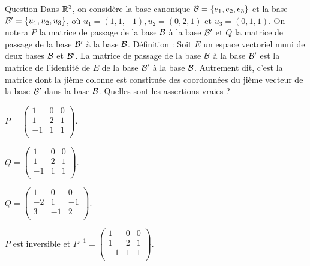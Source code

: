 \begin{multi}[multiple,feedback=
{Une matrice de passage est inversible, puisque l'application linéaire associée est bijective. L'inverse de la matrice de passage de la base \({\cal {B}}\) à la base \({\cal {B}}'\) est la matrice de passage de la base \({\cal {B}}'\) à la base \({\cal {B}}\).\\
\(P = \left(\begin{array}{rcc}
1&0&0\\
1&2&1\\ 
-1&1&1\\ 
\end{array}\right)\) et \(
Q = P^{-1} = \left(\begin{array}{rcc}
1&0&0\\
-2&1&-1\\ 
3&-1&2\\ 
\end{array}\right)\).
}]{Question}
Dans \(\mathbb{R}^3\), on considère la base canonique \({\cal {B}} =\{e_1,e_2,e_3\}\) et  la base \({\cal {B'}} =\{u_1,u_2,u_3\}\), où 
\(u_1=(1,1,-1), u_2=(0,2,1)\) et \(u_3=(0,1,1)\). On notera \(P\) la matrice de passage de la base \({\cal {B}}\) à la base \({\cal {B'}}\) et \(Q\) la matrice de passage de la base \({\cal {B'}}\) à la base \({\cal {B}}\).
\vskip0mm
Définition : Soit \(E\) un espace vectoriel muni de deux bases \({\cal {B}}\) et \({\cal {B}}'\).
La matrice de passage de la base \({\cal {B}}\) à la base  \({\cal {B}}'\) est la matrice de l'identité de \(E\) de la base 
\({\cal {B}}'\) à la base  \({\cal {B}}\). Autrement dit, c'est la matrice dont la jième colonne 
est constituée des coordonnées du jième vecteur de la base \({\cal {B}'}\) dans la base  \({\cal {B}}\).
\vskip2mm
Quelles sont les assertions vraies ?

    \item* \(P = \left(\begin{array}{rcc}
1&0&0\\
1&2&1\\
-1&1&1\\
\end{array}\right).\)
    \item \(Q = \left(\begin{array}{rcc}
1&0&0\\
1&2&1\\
-1&1&1\\
\end{array}\right).\)
    \item* \(Q = \left(\begin{array}{rcc}
1&0&0\\
-2&1&-1\\
3&-1&2\\
\end{array}\right).\)
    \item \(P\) est inversible et \(P^{-1}=\left(\begin{array}{rcc}
1&0&0\\
1&2&1\\
-1&1&1\\
\end{array}\right).\)
\end{multi}


